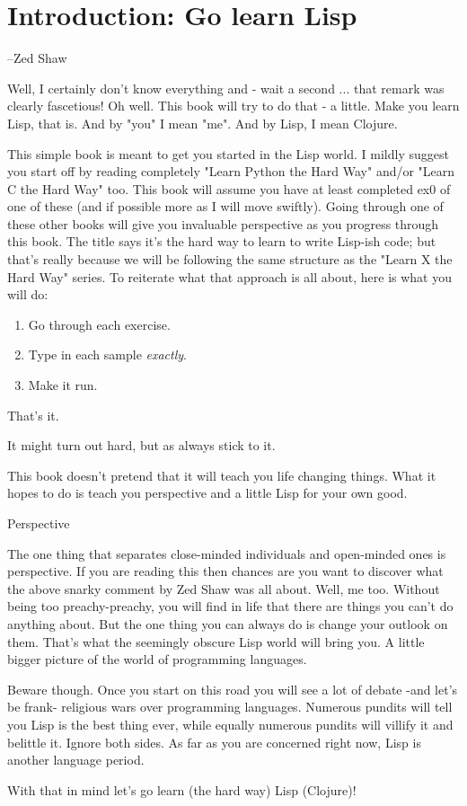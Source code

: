\chapter{Introduction: Go learn Lisp}

--Zed Shaw

Well, I certainly don't know everything and - wait a second ... that remark was clearly fascetious! Oh well. This book will try to do that - a little. Make you learn Lisp, that is. And by "you" I mean "me". And by Lisp, I mean Clojure.

This simple book is meant to get you started in the Lisp world. I mildly suggest you start off by reading completely "Learn Python the Hard Way" and/or "Learn C the Hard Way" too. This book will assume you have at least completed ex0 of one of these (and if possible more as I will move swiftly). Going through one of these other books will give you invaluable perspective as you progress through this book. 
The title says it's the hard way to learn to write Lisp-ish code; but that's really because we will be following the same structure as the "Learn X the Hard Way" series. To reiterate what that approach is all about, here is what you will do:

\begin{enumerate}
\item Go through each exercise.
\item Type in each sample {\em exactly}.
\item Make it run.
\end{enumerate}

That's it.  

It might turn out hard, but as always stick to it.

This book doesn't pretend that it will teach you life changing things. What it hopes to do is teach you perspective and a little Lisp for your own good.

{\Large Perspective}

The one thing that separates close-minded individuals and open-minded ones is perspective. If you are reading this then chances are you want to discover what the above snarky comment by Zed Shaw was all about. Well, me too. Without being too preachy-preachy, you will find in life that there are things you can't do anything about. But the one thing you can always do is change your outlook on them. That's what the seemingly obscure Lisp world will bring you. A little bigger picture of the world of programming languages.

Beware though. Once you start on this road you will see a lot of debate -and let's be frank- religious wars over programming languages. Numerous pundits will tell you Lisp is the best thing ever, while equally numerous pundits will villify it and belittle it. Ignore both sides. As far as you are concerned right now, Lisp is another language period.

With that in mind let's go learn (the hard way) Lisp (Clojure)! 